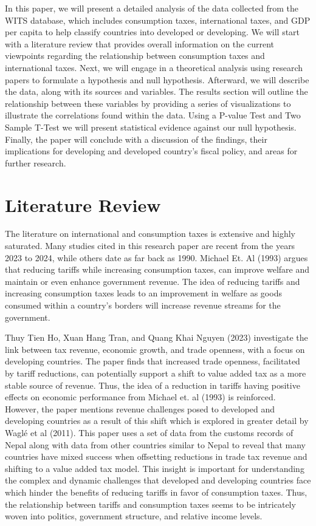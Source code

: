 \documentclass[12pt]{article}
\begin{document}
In this paper, we will present a detailed analysis of the data collected from the WITS database, which includes consumption taxes, international taxes, and GDP per capita to help classify countries into developed or developing. We will start with a literature review that provides overall information on the current viewpoints regarding the relationship between consumption taxes and international taxes. Next, we will engage in a theoretical analysis using research papers to formulate a hypothesis and null hypothesis. Afterward, we will describe the data, along with its sources and variables. The results section will outline the relationship between these variables by providing a series of visualizations to illustrate the correlations found within the data. Using a P-value Test and Two Sample T-Test we will present statistical evidence against our null hypothesis. Finally, the paper will conclude with a discussion of the findings, their implications for developing and developed country's fiscal policy, and areas for further research.


\section{Literature Review} \label{sec:literature}

The literature on international and consumption taxes is extensive and highly saturated. Many studies cited in this research paper are recent from the years 2023 to 2024, while others date as far back as 1990. Michael Et. Al (1993) argues that reducing tariffs while increasing consumption taxes, can improve welfare and maintain or even enhance government revenue. The idea of reducing tariffs and increasing consumption taxes leads to an improvement in welfare as goods consumed within a country's borders will increase revenue streams for the government. 

Thuy Tien Ho, Xuan Hang Tran, and Quang Khai Nguyen (2023) investigate the link between tax revenue, economic growth, and trade openness, with a focus on developing countries. The paper finds that increased trade openness, facilitated by tariff reductions, can potentially support a shift to value added tax as a more stable source of revenue. Thus, the idea of a reduction in tariffs having positive effects on economic performance from Michael et. al (1993) is reinforced.  However, the paper mentions revenue challenges posed to developed and developing countries as a result of this shift which is explored in greater detail by Waglé et al (2011). This paper uses a set of data from the customs records of Nepal along with data from other countries similar to Nepal to reveal that many countries have mixed success when offsetting reductions in trade tax revenue and shifting to a value added tax model. This insight is important for understanding the complex and dynamic challenges that developed and developing countries face which hinder the benefits of reducing tariffs in favor of consumption taxes. Thus, the relationship between tariffs and consumption taxes seems to be intricately woven into politics, government structure, and relative income levels. 
\end{document}
